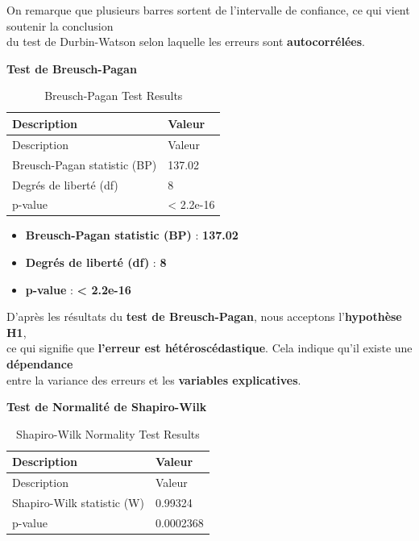 \documentclass[
  12pt,
]{article}
\providecommand{\tightlist}{%
  \setlength{\itemsep}{0pt}\setlength{\parskip}{0pt}}
\begin{document}
On remarque que plusieurs barres sortent de l'intervalle de confiance,
ce qui vient soutenir la conclusion\\
du test de Durbin-Watson selon laquelle les erreurs sont
\textbf{autocorrélées}.

\textbf{Test de Breusch-Pagan}

\begin{longtable}[]{@{}ll@{}}
\caption{Breusch-Pagan Test Results}\tabularnewline
\toprule\noalign{}
Description & Valeur \\
\midrule\noalign{}
\endfirsthead
\toprule\noalign{}
Description & Valeur \\
\midrule\noalign{}
\endhead
\bottomrule\noalign{}
\endlastfoot
Breusch-Pagan statistic (BP) & 137.02 \\
Degrés de liberté (df) & 8 \\
p-value & \textless{} 2.2e-16 \\
\end{longtable}

\begin{itemize}
\tightlist
\item
  \textbf{Breusch-Pagan statistic (BP)} : \textbf{137.02}\\
\item
  \textbf{Degrés de liberté (df)} : \textbf{8}\\
\item
  \textbf{p-value} : \textbf{\textless{} 2.2e-16}
\end{itemize}

D'après les résultats du \textbf{test de Breusch-Pagan}, nous acceptons
l'\textbf{hypothèse H1},\\
ce qui signifie que \textbf{l'erreur est hétéroscédastique}. Cela
indique qu'il existe une \textbf{dépendance}\\
entre la variance des erreurs et les \textbf{variables explicatives}.

\textbf{Test de Normalité de Shapiro-Wilk}

\begin{longtable}[]{@{}ll@{}}
\caption{Shapiro-Wilk Normality Test Results}\tabularnewline
\toprule\noalign{}
Description & Valeur \\
\midrule\noalign{}
\endfirsthead
\toprule\noalign{}
Description & Valeur \\
\midrule\noalign{}
\endhead
\bottomrule\noalign{}
\endlastfoot
Shapiro-Wilk statistic (W) & 0.99324 \\
p-value & 0.0002368 \\
\end{longtable}
\end{document}
